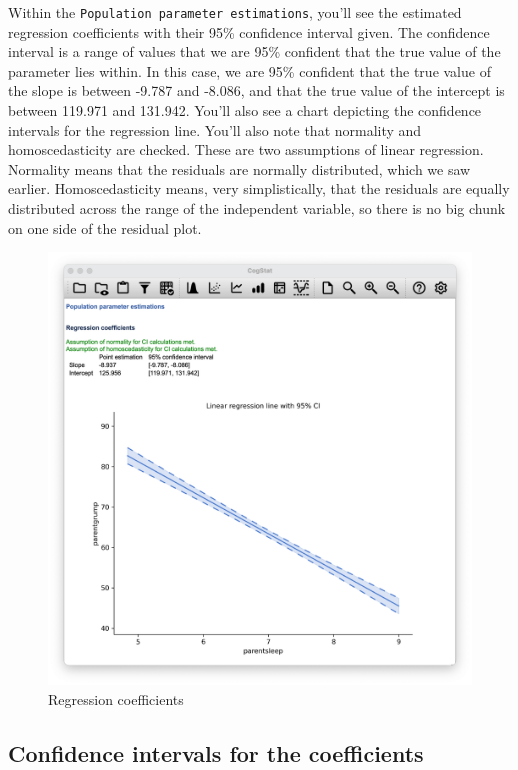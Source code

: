\documentclass[
]{book}
\theoremstyle{definition}
\theoremstyle{definition}
\theoremstyle{definition}
\theoremstyle{definition}
\theoremstyle{remark}
\begin{document}
Within the \texttt{Population\ parameter\ estimations}, you'll see the estimated regression coefficients with their 95\% confidence interval given. The confidence interval is a range of values that we are 95\% confident that the true value of the parameter lies within. In this case, we are 95\% confident that the true value of the slope is between -9.787 and -8.086, and that the true value of the intercept is between 119.971 and 131.942. You'll also see a chart depicting the confidence intervals for the regression line. You'll also note that normality and homoscedasticity are checked. These are two assumptions of linear regression. Normality means that the residuals are normally distributed, which we saw earlier. Homoscedasticity means, very simplistically, that the residuals are equally distributed across the range of the independent variable, so there is no big chunk on one side of the residual plot.

\begin{figure}

{\centering \includegraphics[width=0.66\linewidth]{resources/image/cogstatregressioncoeff} 

}

\caption{Regression coefficients}\label{fig:parentregressionresults}
\end{figure}

\hypertarget{confidence-intervals-for-the-coefficients}{%
\subsection{Confidence intervals for the coefficients}\label{confidence-intervals-for-the-coefficients}}
\end{document}
